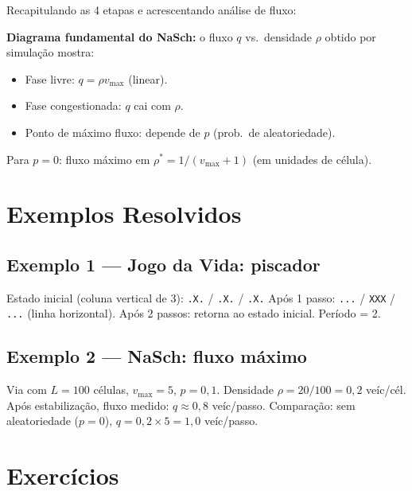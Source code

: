 \documentclass[12pt,a4paper]{article}
\begin{document}
Recapitulando as 4 etapas e acrescentando an\'alise de fluxo:

\textbf{Diagrama fundamental do NaSch:} o fluxo $q$ vs.\ densidade $\rho$ obtido por simula\c{c}\~ao mostra:
\begin{itemize}
  \item Fase livre: $q = \rho v_\text{max}$ (linear).
  \item Fase congestionada: $q$ cai com $\rho$.
  \item Ponto de m\'aximo fluxo: depende de $p$ (prob.\ de aleatoriedade).
\end{itemize}
Para $p=0$: fluxo m\'aximo em $\rho^* = 1/(v_\text{max}+1)$ (em unidades de c\'elula).

\section*{Exemplos Resolvidos}

\subsection*{Exemplo 1 --- Jogo da Vida: piscador}
Estado inicial (coluna vertical de 3): \texttt{.X.} / \texttt{.X.} / \texttt{.X.}
Ap\'os 1 passo: \texttt{...} / \texttt{XXX} / \texttt{...} (linha horizontal).
Ap\'os 2 passos: retorna ao estado inicial. Per\'iodo = 2.

\subsection*{Exemplo 2 --- NaSch: fluxo m\'aximo}
Via com $L=100$ c\'elulas, $v_\text{max}=5$, $p=0{,}1$. Densidade $\rho = 20/100 = 0{,}2$ ve\'ic/c\'el. Ap\'os estabiliza\c{c}\~ao, fluxo medido: $q \approx 0{,}8$ ve\'ic/passo. Compara\c{c}\~ao: sem aleatoriedade ($p=0$), $q = 0{,}2\times5 = 1{,}0$ ve\'ic/passo.

\section*{Exerc\'icios}
\end{document}
